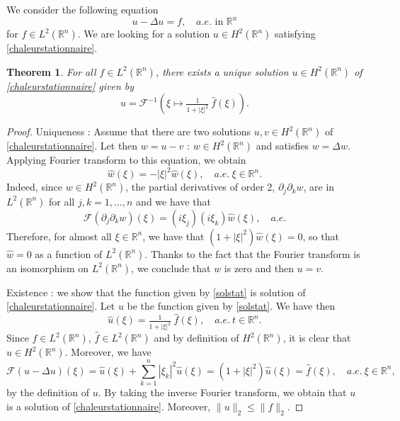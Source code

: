 \documentclass[a4paper, 12pt]{article}
\theoremstyle{plain}
\newtheorem{theorem}[proposition]{Theorem}
\theoremstyle{definition}
\theoremstyle{remark}
\numberwithin{equation}{section}
\begin{document}
We consider the following equation
%
\begin{equation}
\label{chaleurstationnaire}
u - \Delta u = f, \quad a.e. \mbox{ in } {\mathds{R}}^n
\end{equation}
%
for $f\in L^2({\mathds{R}}^n)$. We are looking for a solution $u\in H^2({\mathds{R}}^n)$ satisfying \eqref{chaleurstationnaire}.

\begin{theorem}
For all $f\in L^2({\mathds{R}}^n)$, there exists a unique solution $u\in H^2({\mathds{R}}^n)$ of \eqref{chaleurstationnaire} given by
%
\begin{equation} 
\label{solstat}
u ={\mathscr{F}}^{-1} \left( \xi\mapsto \tfrac{1}{1 +|\xi|^2} \  \hat{f}(\xi) \right).
\end{equation}
\end{theorem}

\begin{proof}
Uniqueness : Assume that there are two solutions $u,v \in H^2({\mathds{R}}^n)$ of \eqref{chaleurstationnaire}.
Let then $w=u-v$ : $w \in H^2({\mathds{R}}^n)$ and satisfies $w=\Delta w$. Applying Fourier transform to this equation, we obtain
\[
\hat{w}(\xi) = -|\xi|^2 \hat{w}(\xi), \quad a.e.\ \xi\in{\mathds{R}}^n.
\]
Indeed, since $w \in H^2({\mathds{R}}^n)$, the partial derivatives of order 2, $\partial_j\partial_kw$, are in $L^2({\mathds{R}}^n)$ 
for all $j,k=1,\dots, n$ and we have that  
\[
{\mathscr{F}}(\partial_j\partial_k w)(\xi) = (i\xi_j)(i\xi_k) \hat{w}(\xi), \quad a.e.
\]
Therefore, for almost all $\xi \in {\mathds{R}}^n$, we have that $(1+|\xi|^2)\hat{w}(\xi)=0$, so that $\hat{w} =0$ as a function of 
$L^2({\mathds{R}}^n)$. Thanks to the fact that the Fourier transform is an isomorphism on $L^2({\mathds{R}}^n)$, we conclude that $w$ is
zero and then $u=v$.

\noindent
Existence : we show that the function given by \eqref{solstat} is solution of \eqref{chaleurstationnaire}. Let $u$ be the function
given by \eqref{solstat}. We have then 
\[
\hat{u} (\xi) = \tfrac{1}{1 +|\xi|^2} \  \hat{f}(\xi), \quad a.e. \ t\in {\mathds{R}}^n.
\]
Since $f \in L^2({\mathds{R}}^n)$, $ \hat{f}\in L^2({\mathds{R}}^n)$ and by definition of $H^2({\mathds{R}}^n)$, it is
clear that $u\in  H^2({\mathds{R}}^n)$. Moreover, we have  
\[
{\mathscr{F}} (u -\Delta u)(\xi) = \hat{u}(\xi) + \sum_{k=1}^n |\xi_k|^2 \hat{u}(\xi) = (1 +|\xi|^2)\hat{u}(\xi) = \hat{f}(\xi), \quad a.e.\ \xi\in {\mathds{R}}^n,
\]
by the definition of $u$. By taking the inverse Fourier transform, we obtain that $u$ is a solution of \eqref{chaleurstationnaire}. 
Moreover, $\|u\|_2 \le \|f\|_2$.
\end{proof}
\end{document}
